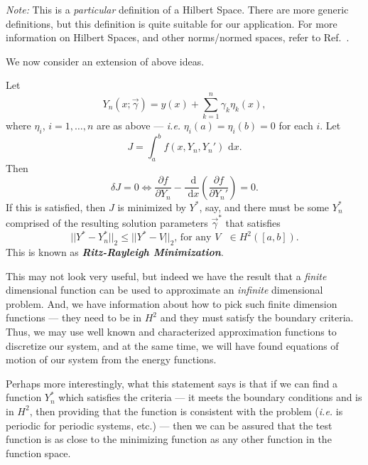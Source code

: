 \emph{Note:} This is a \emph{particular} definition of a Hilbert Space. There are more generic definitions, but this definition is quite suitable for our application. For more information on Hilbert Spaces, and other norms/normed spaces, refer to Ref.~\cite{brenner2008mathematical}.

We now consider an extension of above ideas. 
\begin{definition}
Let
\begin{equation}
Y_n(x;\vec\gamma) = y(x)+\sum_{k=1}^n\gamma_k\eta_k(x),
\end{equation}
where $\eta_i$, $i=1,\dots,n$ are as above --- \emph{i.e.} $\eta_i(a) = \eta_i(b) = 0$ for each $i$. Let 
\begin{equation}
J = \int_a^b{f(x,Y_n,Y_n')}\text{ d}x.
\end{equation}
Then 
\begin{equation}
\delta J = 0 \Leftrightarrow \frac{\partial f}{\partial Y_n}-\frac{\text{ d}}{\text{ d}x}\left(\frac{\partial f}{\partial Y_n'}\right) = 0.
\end{equation}
If this is satisfied, then $J$ is minimized by $Y^*$, say, and there must be some $Y_n^*$ comprised of the resulting solution parameters $\vec\gamma^*$ that satisfies
\begin{equation}
||Y^*-Y_n^*||_2\leq||Y^*-V||_2\text{, for any $V$ $\in H^2([a,b]).$}
\end{equation}
This is known as \emph{\textbf{Ritz-Rayleigh Minimization}}.
\end{definition}
This may not look very useful, but indeed we have the result that a \emph{finite} dimensional function can be used to approximate an \emph{infinite} dimensional problem. And, we have information about how to pick such finite dimension functions --- they need to be in $H^2$ and they must satisfy the boundary criteria. Thus, we may use well known and characterized approximation functions to discretize our system, and at the same time, we will have found equations of motion of our system from the energy functions.

Perhaps more interestingly, what this statement says is that if we can find a function $Y^*_n$ which satisfies the criteria --- it meets the boundary conditions and is in $H^2$, then providing that the function is consistent with the problem (\emph{i.e.} is periodic for periodic systems, etc.) --- then we can be assured that the test function is as close to the minimizing function as any other function in the function space.

